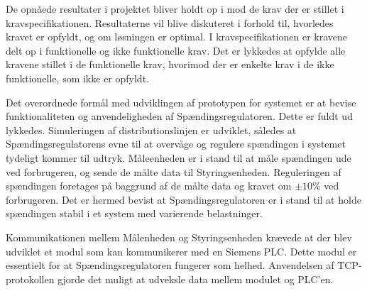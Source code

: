 
De opnåede resultater i projektet bliver holdt op i mod de krav der er stillet i kravspecifikationen. Resultaterne vil blive diskuteret i forhold til, hvorledes kravet er opfyldt, og om løsningen er optimal. I kravspecifikationen er kravene delt op i funktionelle og ikke funktionelle krav. Det er lykkedes at opfylde alle kravene stillet i de funktionelle krav, hvorimod der er enkelte krav i de ikke funktionelle, som ikke er opfyldt. 

Det overordnede formål med udviklingen af prototypen for systemet er at bevise funktionaliteten og anvendeligheden af Spændingsregulatoren. Dette er fuldt ud lykkedes. Simuleringen af distributionslinjen er udviklet, således at Spændingsregulatorens evne til at overvåge og regulere spændingen i systemet tydeligt kommer til udtryk. Måleenheden er i stand til at måle spændingen ude ved forbrugeren, og sende de målte data til Styringsenheden. Reguleringen af spændingen foretages på baggrund af de målte data og kravet om $\pm10\%$ ved forbrugeren. Det er hermed bevist at Spændingsregulatoren er i stand til at holde spændingen stabil i et system med varierende belastninger. 

Kommunikationen mellem Målenheden og Styringsenheden krævede at der blev udviklet et modul som kan kommunikerer med en Siemens PLC. Dette modul er essentielt for at Spændingsregulatoren fungerer som helhed. Anvendelsen af TCP-protokollen gjorde det muligt at udveksle data mellem modulet og PLC'en. 


